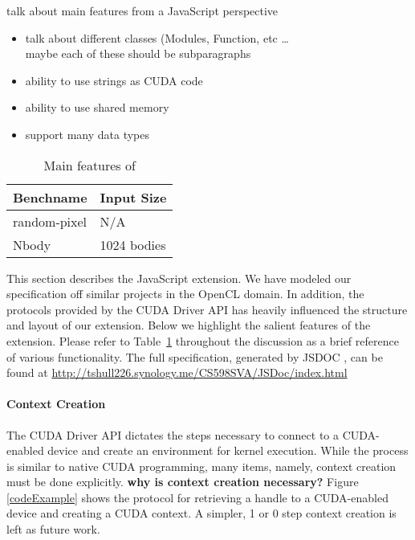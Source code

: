 

talk about main features from a JavaScript perspective
\begin{itemize}
\item talk about different classes (Modules, Function, etc \ldots\\
maybe each of these should be subparagraphs
\item ability to use strings as CUDA code
\item ability to use shared memory
\item support many data types
\end{itemize}

\begin{table}
\begin{center}
\begin{tabular}{| l | l |}
\hline
Benchname & Input Size \\
\hline
random-pixel & N/A \\
\hline
Nbody &  1024 bodies \\
\hline
\end{tabular}
\end{center}
\caption{Main features of \name}
\label{webcudaSpec}
\end{table}

This section describes the \name JavaScript extension. We have modeled our
specification off similar projects \cite{webCL, nokiaCL, amdCL} in the OpenCL
domain.  In addition, the protocols provided by the CUDA Driver API
\cite{cudaAPI} has heavily influenced the structure and layout of our extension.
Below we highlight the salient features of the extension. Please refer to
Table~\ref{webcudaSpec} throughout the discussion as a brief reference of
various \name functionality. The full \name specification, generated by JSDOC
\cite{JSDOC}, can be found at
\url{http://tshull226.synology.me/CS598SVA/JSDoc/index.html}


\begin{figure*}
	\begin{center}
		
	\end{center}
	\caption{Simple \name Example}
	\label{codeExample}
\end{figure*}

\paragraph{Context Creation} The CUDA Driver API dictates the steps necessary to connect to a CUDA-enabled
device and create an environment for kernel execution. While the process is
similar to native CUDA programming, many items, namely, context creation must be
done explicitly. {\bf why is context creation necessary?}
Figure \ref{codeExample} shows the protocol for retrieving a handle to a
CUDA-enabled device and creating a CUDA context. A simpler, 1 or 0 step context
creation is left as future work.

